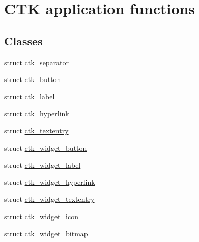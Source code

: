 \hypertarget{group__ctkappfunc}{}\section{C\+T\+K application functions}
\label{group__ctkappfunc}
\subsection*{Classes}
\begin{DoxyCompactItemize}
\item 
struct \hyperlink{structctk__separator}{ctk\+\_\+separator}
\item 
struct \hyperlink{structctk__button}{ctk\+\_\+button}
\item 
struct \hyperlink{structctk__label}{ctk\+\_\+label}
\item 
struct \hyperlink{structctk__hyperlink}{ctk\+\_\+hyperlink}
\item 
struct \hyperlink{structctk__textentry}{ctk\+\_\+textentry}
\item 
struct \hyperlink{structctk__widget__button}{ctk\+\_\+widget\+\_\+button}
\item 
struct \hyperlink{structctk__widget__label}{ctk\+\_\+widget\+\_\+label}
\item 
struct \hyperlink{structctk__widget__hyperlink}{ctk\+\_\+widget\+\_\+hyperlink}
\item 
struct \hyperlink{structctk__widget__textentry}{ctk\+\_\+widget\+\_\+textentry}
\item 
struct \hyperlink{structctk__widget__icon}{ctk\+\_\+widget\+\_\+icon}
\item 
struct \hyperlink{structctk__widget__bitmap}{ctk\+\_\+widget\+\_\+bitmap}
\end{DoxyCompactItemize}
